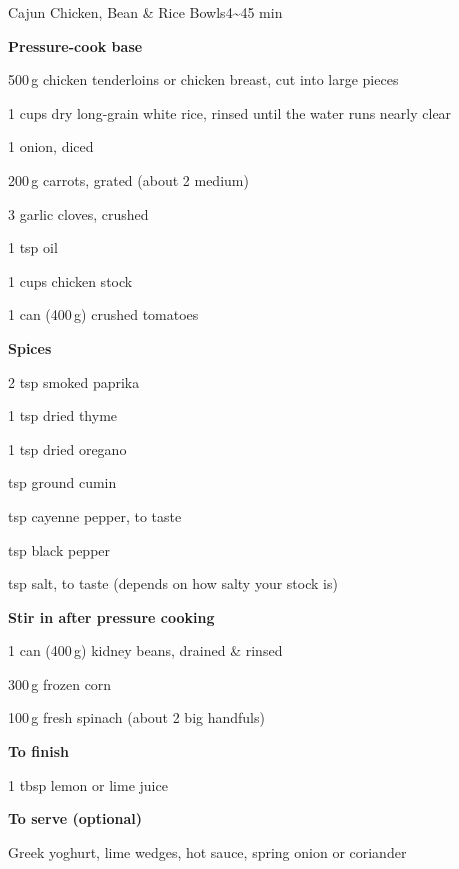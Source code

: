 \begin{recipebox}{Cajun Chicken, Bean \& Rice Bowls}{4}{\textasciitilde45 min}
\begin{ingredients}
  \item \textbf{Pressure-cook base}
  \item 500\,g chicken tenderloins or chicken breast, cut into large pieces
  \item 1 cups dry long-grain white rice, rinsed until the water runs nearly clear
  \item 1 onion, diced
  \item 200\,g carrots, grated (about 2 medium)
  \item 3 garlic cloves, crushed
  \item 1 tsp oil
  \item 1 cups chicken stock
  \item 1 can (400\,g) crushed tomatoes
  \item[] \textbf{Spices}
  \item 2 tsp smoked paprika
  \item 1 tsp dried thyme
  \item 1 tsp dried oregano
  \item {} tsp ground cumin
  \item {} tsp cayenne pepper, to taste
  \item {} tsp black pepper
  \item {} tsp salt, to taste (depends on how salty your stock is)
  \item[] \textbf{Stir in after pressure cooking}
  \item 1 can (400\,g) kidney beans, drained \& rinsed
  \item 300\,g frozen corn
  \item 100\,g fresh spinach (about 2 big handfuls)
  \item[] \textbf{To finish}
  \item 1 tbsp lemon or lime juice
  \item[] \textbf{To serve (optional)}
  \item Greek yoghurt, lime wedges, hot sauce, spring onion or coriander
\end{ingredients}


\end{recipebox}
